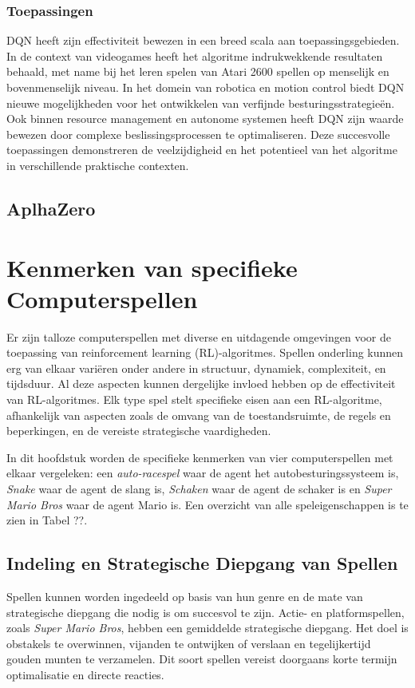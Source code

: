 \documentclass[a4paper,12pt]{report}
\begin{document}
\subsection{Toepassingen}
DQN heeft zijn effectiviteit bewezen in een breed scala aan
toepassingsgebieden. In de context van videogames heeft het algoritme
indrukwekkende resultaten behaald, met name bij het leren spelen van Atari 2600
spellen op menselijk en bovenmenselijk niveau. In het domein van robotica en
motion control biedt DQN nieuwe mogelijkheden voor het ontwikkelen van
verfijnde besturingsstrategieën. Ook binnen resource management en autonome
systemen heeft DQN zijn waarde bewezen door complexe beslissingsprocessen te
optimaliseren. Deze succesvolle toepassingen demonstreren de veelzijdigheid en
het potentieel van het algoritme in verschillende praktische contexten.
\section{AplhaZero}

\chapter{Kenmerken van specifieke Computerspellen}
Er zijn talloze computerspellen met diverse en uitdagende omgevingen voor de
toepassing van reinforcement learning (RL)-algoritmes. Spellen onderling kunnen
erg van elkaar variëren onder andere in structuur, dynamiek, complexiteit, en
tijdsduur. Al deze aspecten kunnen dergelijke invloed hebben op de
effectiviteit van RL-algoritmes. Elk type spel stelt specifieke eisen aan een
RL-algoritme, afhankelijk van aspecten zoals de omvang van de toestandsruimte,
de regels en beperkingen, en de vereiste strategische vaardigheden.

In dit hoofdstuk worden de specifieke kenmerken van vier computerspellen met
elkaar vergeleken: een \textit{auto-racespel} waar de agent het
autobesturingssysteem is, \textit{Snake} waar de agent de slang is,
\textit{Schaken} waar de agent de schaker is en \textit{Super Mario Bros} waar
de agent Mario is. Een overzicht van alle speleigenschappen is te zien in Tabel
??.

\section{Indeling en Strategische Diepgang van Spellen} Spellen kunnen worden ingedeeld op basis van hun genre en de mate van
strategische diepgang die nodig is om succesvol te zijn. Actie- en
platformspellen, zoals \textit{Super Mario Bros}, hebben een gemiddelde
strategische diepgang. Het doel is obstakels te overwinnen, vijanden te
ontwijken of verslaan en tegelijkertijd gouden munten te verzamelen. Dit soort
spellen vereist doorgaans korte termijn optimalisatie en directe reacties.
\end{document}
